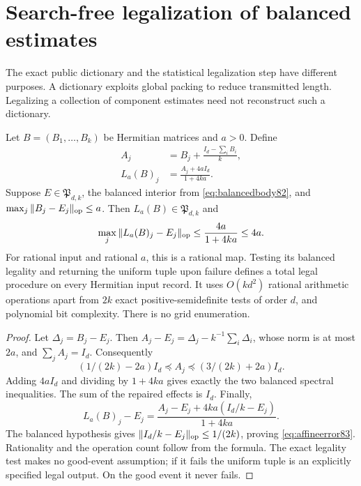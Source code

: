 \section{Search-free legalization of balanced estimates}
\label{sec:affinerepair83}

The exact public dictionary and the statistical legalization step
have different purposes.  A dictionary exploits global packing to
reduce transmitted length.  Legalizing a collection of component
estimates need not reconstruct such a dictionary.

\begin{theorem}
\label{thm:affinerepair83}
Let $B=(B_1,\ldots,B_k)$ be Hermitian matrices and $a>0$.  Define
\begin{align}
 A_j&=B_j+\frac{I_d-\sum_iB_i}{k},\label{eq:affineprojection83}\\
 L_a(B)_j&=\frac{A_j+4a I_d}{1+4ka}.\label{eq:affinerepair83}
\end{align}
Suppose $E\in\mathfrak P_{d,k}$, the balanced interior from
\eqref{eq:balancedbody82}, and
$\max_j\|B_j-E_j\|_{\rm op}\le a$.
Then $L_a(B)\in\mathfrak P_{d,k}$ and
\begin{equation}\label{eq:affineerror83}
 \max_j\|L_a(B)_j-E_j\|_{\rm op}
 \le\frac{4a}{1+4ka}\le4a.
\end{equation}
For rational input and rational $a$, this is a rational map.  Testing
its balanced legality and returning the uniform tuple upon failure
defines a total legal procedure on every Hermitian input record.
It uses $O(kd^2)$ rational arithmetic operations apart from $2k$
exact positive-semidefinite tests of order $d$, and polynomial bit
complexity.  There is no grid enumeration.
\end{theorem}
\begin{proof}
Let $\Delta_j=B_j-E_j$.  Then
$A_j-E_j=\Delta_j-k^{-1}\sum_i\Delta_i$, whose norm is at most $2a$,
and $\sum_jA_j=I_d$.  Consequently
\[
 (1/(2k)-2a)I_d\preceq A_j\preceq(3/(2k)+2a)I_d.
\]
Adding $4aI_d$ and dividing by $1+4ka$ gives exactly the two
balanced spectral inequalities.  The sum of the repaired effects
is $I_d$.  Finally,
\[
 L_a(B)_j-E_j
 =\frac{A_j-E_j+4ka(I_d/k-E_j)}{1+4ka}.
\]
The balanced hypothesis gives $\|I_d/k-E_j\|_{\rm op}\le1/(2k)$,
proving \eqref{eq:affineerror83}.  Rationality and the operation count
follow from the formula.  The exact legality test makes no good-event
assumption; if it fails the uniform tuple is an explicitly specified
legal output.  On the good event it never fails.
\end{proof}

